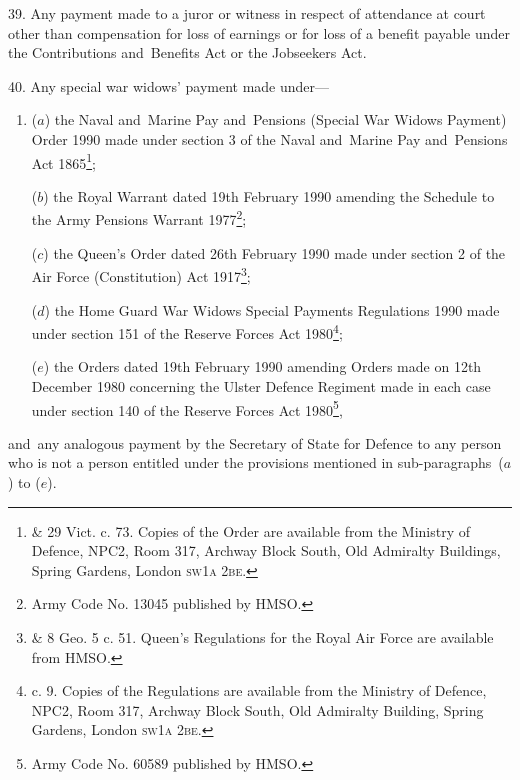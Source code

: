 \documentclass[12pt,a4paper]{article}
\begin{document}
39.  Any payment made to a juror or witness in respect of attendance at court other than compensation for loss of earnings or for loss of a benefit payable under the Contributions and~Benefits Act
or the Jobseekers Act.  %


\medskip

40.  Any special war widows' payment made under—
\begin{enumerate}\item[]
($a$) the Naval and~Marine Pay and~Pensions (Special War Widows Payment) Order 1990 made under section 3 of the Naval and~Marine Pay and~Pensions Act 1865\footnote{ \& 29 Vict. c. 73. Copies of the Order are available from the Ministry of Defence, NPC2, Room 317, Archway Block South, Old Admiralty Buildings, Spring Gardens, London \textsc{\lowercase{SW1A 2BE}}.};

($b$) the Royal Warrant dated 19th February 1990 amending the Schedule to the Army Pensions Warrant 1977\footnote{\frenchspacing Army Code No. 13045 published by HMSO.};

($c$) the Queen’s Order dated 26th February 1990 made under section 2 of the Air Force (Constitution) Act 1917\footnote{ \& 8 Geo. 5 c. 51. Queen’s Regulations for the Royal Air Force are available from HMSO.};

($d$) the Home Guard War Widows Special Payments Regulations 1990 made under section 151 of the Reserve Forces Act 1980\footnote{ c. 9. Copies of the Regulations are available from the Ministry of Defence, NPC2, Room 317, Archway Block South, Old Admiralty Building, Spring Gardens, London \textsc{\lowercase{SW1A 2BE}}.};

($e$) the Orders dated 19th February 1990 amending Orders made on 12th December 1980 concerning the Ulster Defence Regiment made in each case under section 140 of the Reserve Forces Act 1980\footnote{\frenchspacing Army Code No. 60589 published by HMSO.},
\end{enumerate}
and~any analogous payment by the Secretary of State for Defence to any person who is not a person entitled under the provisions mentioned in sub-paragraphs~($a$) to ($e$).

\medskip
\end{document}
